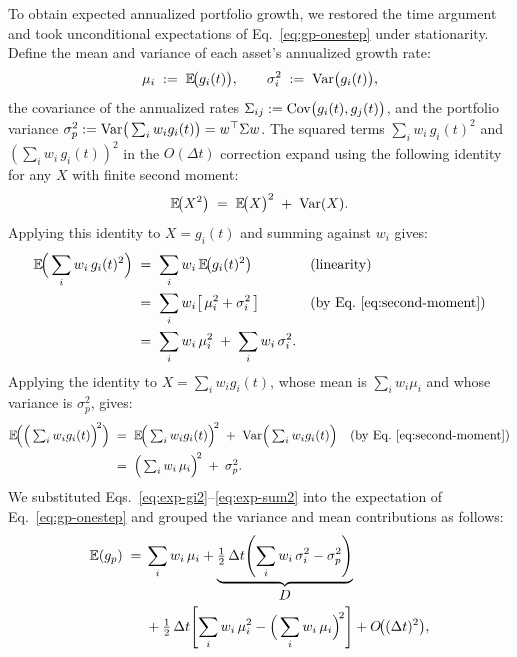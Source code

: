 To obtain expected annualized portfolio growth, we restored the time
argument and took unconditional expectations of
Eq.~\eqref{eq:gp-onestep} under stationarity. Define the mean and
variance of each asset's annualized growth rate:
\begin{equation}
  \mu_i \;:=\; \mathbb{E}\!\big(g_i(t)\big), \qquad
  \sigma_i^2 \;:=\; \operatorname{Var}\!\big(g_i(t)\big),
\end{equation}
the covariance of the annualized rates
$\Sigma_{ij} := \operatorname{Cov}\!\big(g_i(t), g_j(t)\big)$, and the portfolio
variance
$\sigma_p^2 := \operatorname{Var}\!\big(\textstyle\sum_i w_i g_i(t)\big) =
w^\top \Sigma w$. The squared terms $\sum_i w_i\, g_i(t)^2$ and $(\sum_i w_i\, g_i(t))^2$ in the $O(\Delta t)$ correction expand using the following identity for any $X$ with finite second moment:
\begin{equation}
  \mathbb{E}\!\big(X^2\big) \;=\; \mathbb{E}\!\big(X\big)^2 \;+\; \operatorname{Var}(X).
  \label{eq:second-moment}
\end{equation}
Applying this identity to $X = g_i(t)$ and summing against $w_i$ gives:
\begin{align}
  \mathbb{E}\!\Big(\sum_{i} w_i\, g_i(t)^2\Big)
   &\;=\; \sum_{i} w_i\, \mathbb{E}\!\big(g_i(t)^2\big)
       && \text{(linearity)} \notag \\
   &\;=\; \sum_{i} w_i\!\left[\,\mu_i^2 + \sigma_i^2\,\right]
       && \text{(by Eq.~\eqref{eq:second-moment})} \notag \\
   &\;=\; \sum_{i} w_i\, \mu_i^2 \;+\; \sum_{i} w_i\, \sigma_i^2.
   \label{eq:exp-gi2}
\end{align}
Applying the identity to $X = \sum_i w_i g_i(t)$, whose mean is
$\sum_i w_i\mu_i$ and whose variance is $\sigma_p^2$, gives:
\begin{align}
  \mathbb{E}\!\Big(\Big(\textstyle\sum_{i} w_i g_i(t)\Big)^{\!2}\Big)
   &\;=\; \mathbb{E}\!\Big(\textstyle\sum_{i} w_i g_i(t)\Big)^{\!2}
       \;+\; \operatorname{Var}\!\Big(\textstyle\sum_{i} w_i g_i(t)\Big)
       && \text{(by Eq.~\eqref{eq:second-moment})} \notag \\
   &\;=\; \Big(\textstyle\sum_{i} w_i\, \mu_i\Big)^{\!2}
       \;+\; \sigma_p^2.
   \label{eq:exp-sum2}
\end{align}
We substituted Eqs.~\eqref{eq:exp-gi2}--\eqref{eq:exp-sum2} into the
expectation of Eq.~\eqref{eq:gp-onestep} and grouped the variance and
mean contributions as follows:
\begin{equation}
\begin{aligned}
  \mathbb{E}(g_p) \;={}& \sum_{i} w_i\, \mu_i
  + \underbrace{\tfrac{1}{2}\,\Delta t\!\left(\sum_{i} w_i\, \sigma_i^2
       - \sigma_p^2\right)}_{\displaystyle D} \\
  &+ \tfrac{1}{2}\,\Delta t\!\left[\sum_{i} w_i\, \mu_i^2
       - \Big(\sum_{i} w_i\, \mu_i\Big)^{\!2}\right]
  + O\!\big((\Delta t)^2\big),
\end{aligned}
  \label{eq:booth-fama}
\end{equation}
